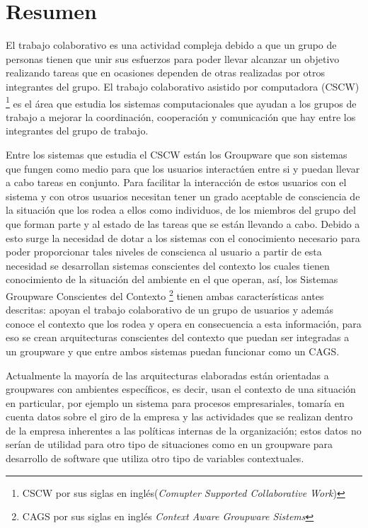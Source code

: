 
\section{Resumen}
El trabajo colaborativo es una actividad compleja debido a que un grupo de personas tienen que unir sus esfuerzos para poder llevar alcanzar un objetivo realizando tareas que en ocasiones dependen de otras realizadas por otros integrantes del grupo. El trabajo colaborativo asistido por computadora (CSCW) \footnote{CSCW por sus siglas en ingl\'es(\textit{Comupter Supported Collaborative Work})} es el \'area que estudia los sistemas computacionales que ayudan a los grupos de trabajo a mejorar la coordinaci\'on, cooperaci\'on y comunicaci\'on que hay entre los integrantes del grupo de trabajo.

Entre los sistemas que estudia el CSCW est\'an los Groupware que son sistemas que fungen como medio para que los usuarios interact\'uen entre si y puedan llevar a cabo tareas en conjunto. Para facilitar la interacci\'on de estos usuarios con el sistema y con otros usuarios necesitan tener un grado aceptable de consciencia de la situaci\'on que los rodea a ellos como individuos, de los miembros del grupo del que forman parte y al estado de las tareas que se est\'an llevando a cabo. Debido a esto surge la necesidad de dotar a los sistemas con el conocimiento necesario para poder proporcionar tales niveles de conscienca al usuario a partir de esta necesidad se desarrollan sistemas conscientes del contexto los cuales tienen conocimiento de la situaci\'on del ambiente en el que operan, as\'i, los Sistemas Groupware Conscientes del Contexto \footnote{CAGS por sus siglas en ingl\'es \textit{Context Aware Groupware Sistems}} tienen ambas caracter\'isticas antes descritas: apoyan el trabajo colaborativo de un grupo de usuarios y adem\'as conoce el contexto que los rodea y opera en consecuencia a esta informaci\'on, para eso se crean arquitecturas conscientes del contexto que puedan ser integradas a un groupware y que entre ambos sistemas puedan funcionar como un CAGS.

Actualmente la mayor\'ia de las arquitecturas elaboradas est\'an orientadas a groupwares con ambientes espec\'ificos, es decir, usan el contexto de una situaci\'on en particular, por ejemplo un sistema para  procesos empresariales, tomar\'ia en cuenta datos sobre el giro de la empresa y las actividades que se realizan dentro de la empresa inherentes a las pol\'iticas internas de la organizaci\'on; estos datos no ser\'ian de utilidad para otro tipo de situaciones como en un groupware para desarrollo de software que utiliza otro tipo de variables contextuales.

